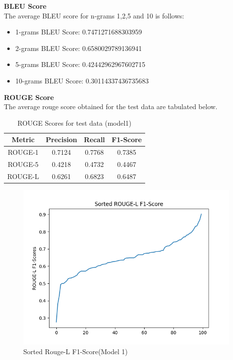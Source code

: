 \textbf{BLEU Score}\\
The average BLEU score for n-grams 1,2,5 and 10 is follows:
\begin{itemize}
    \item 1-grams BLEU Score: 0.7471271688303959
    \item 2-grams BLEU Score: 0.6580029789136941
    \item 5-grams BLEU Score:  0.42442962967602715
    \item 10-grams BLEU Score: 0.30114337436735683
\end{itemize}
\textbf{ROUGE Score}\\
The average rouge score obtained for the test data are tabulated below.
\begin{table}[H]
    \caption{ROUGE Scores for test data (model1)}
    \label{tab:sampl}
    \centering
    \begin{tabular}{|c|c|c|c|}
        \hline
        \textbf{Metric} & \textbf{Precision} & \textbf{Recall} &\textbf{F1-Score}\\
        \hline
        ROUGE-1 & 0.7124 & 0.7768 &0.7385 \\
        \hline
        ROUGE-5 & 0.4218&0.4732 & 0.4467 \\
        \hline
        ROUGE-L & 0.6261 & 0.6823 & 0.6487 \\
        \hline
    \end{tabular}
\end{table}
\begin{figure}[H]
    \includegraphics[scale=.8]{images/sr1.png}
    \caption{Sorted Rouge-L F1-Score(Model 1)}
    \label{fig:lf11}
\end{figure}

